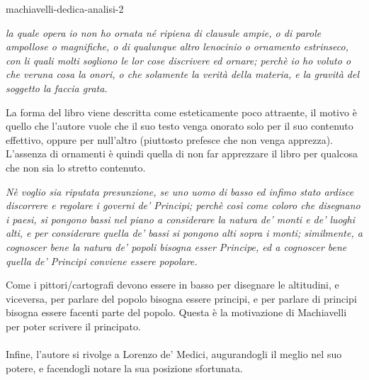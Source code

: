 \documentclass[preview]{standalone}
\begin{document}
\begin{snippet}{machiavelli-dedica-analisi-2}
    \begin{center}
        \begin{minipage}{0.75\textwidth}
            \itshape
            la quale opera io non ho ornata né ripiena di clausule ampie, o di parole ampollose o magnifiche, o di qualunque altro lenocinio o ornamento estrinseco, con li quali molti sogliono le lor cose discrivere ed ornare; perchè io ho voluto o che veruna cosa la onori, o che solamente la verità della materia, e la gravità del soggetto la faccia grata.
        \end{minipage}
    \end{center}
    \vspace{0.25cm}

    La forma del libro viene descritta come esteticamente poco attraente,
    il motivo è quello che l'autore vuole che il suo testo venga onorato
    solo per il suo contenuto effettivo, oppure per null'altro (piuttosto prefesce che non venga apprezza).
    L'assenza di ornamenti è quindi quella di non far apprezzare il libro per qualcosa che non sia lo stretto contenuto.
    \vspace{0.25cm}
    \begin{center}
        \begin{minipage}{0.75\textwidth}
            \itshape
            Nè voglio sia riputata presunzione, se uno uomo di basso ed infimo stato ardisce discorrere e regolare i governi de' Principi; perchè così come coloro che disegnano i paesi, si pongono bassi nel piano a considerare la natura de' monti e de' luoghi alti, e per considerare quella de' bassi si pongono alti sopra i monti; similmente, a cognoscer bene la natura de' popoli bisogna esser Principe, ed a cognoscer bene quella de' Principi conviene essere popolare.
        \end{minipage}
    \end{center}
    \vspace{0.25cm}
    Come i pittori/cartografi devono essere in basso per disegnare le altitudini, e viceversa, per parlare
    del popolo bisogna essere principi, e per parlare di principi bisogna essere facenti parte del popolo.
    Questa è la motivazione di Machiavelli per poter scrivere il principato.
    \\\\
    Infine, l'autore si rivolge a Lorenzo de' Medici, augurandogli il meglio nel suo potere, e facendogli
    notare la sua posizione sfortunata.
\end{snippet}
\end{document}
